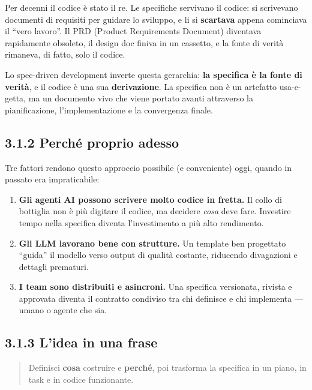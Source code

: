 \documentclass[
  italian,
  10pt,
]{book}
\providecommand{\tightlist}{%
  \setlength{\itemsep}{0pt}\setlength{\parskip}{0pt}}
\begin{document}
Per decenni il codice è stato il re. Le specifiche servivano il codice:
si scrivevano documenti di requisiti per guidare lo sviluppo, e li si
\textbf{scartava} appena cominciava il ``vero lavoro''. Il PRD (Product
Requirements Document) diventava rapidamente obsoleto, il design doc
finiva in un cassetto, e la fonte di verità rimaneva, di fatto, solo il
codice.

Lo spec-driven development inverte questa gerarchia: \textbf{la
specifica è la fonte di verità}, e il codice è una sua
\textbf{derivazione}. La specifica non è un artefatto usa-e-getta, ma un
documento vivo che viene portato avanti attraverso la pianificazione,
l'implementazione e la convergenza finale.

\subsection{3.1.2 Perché proprio adesso}\label{perchuxe9-proprio-adesso}

Tre fattori rendono questo approccio possibile (e conveniente) oggi,
quando in passato era impraticabile:

\begin{enumerate}
\def\labelenumi{\arabic{enumi}.}
\tightlist
\item
  \textbf{Gli agenti AI possono scrivere molto codice in fretta.} Il
  collo di bottiglia non è più digitare il codice, ma decidere
  \emph{cosa} deve fare. Investire tempo nella specifica diventa
  l'investimento a più alto rendimento.
\item
  \textbf{Gli LLM lavorano bene con strutture.} Un template ben
  progettato ``guida'' il modello verso output di qualità costante,
  riducendo divagazioni e dettagli prematuri.
\item
  \textbf{I team sono distribuiti e asincroni.} Una specifica
  versionata, rivista e approvata diventa il contratto condiviso tra chi
  definisce e chi implementa --- umano o agente che sia.
\end{enumerate}

\subsection{3.1.3 L'idea in una frase}\label{lidea-in-una-frase}

\begin{quote}
Definisci \textbf{cosa} costruire e \textbf{perché}, poi trasforma la
specifica in un piano, in task e in codice funzionante.
\end{quote}
\end{document}
